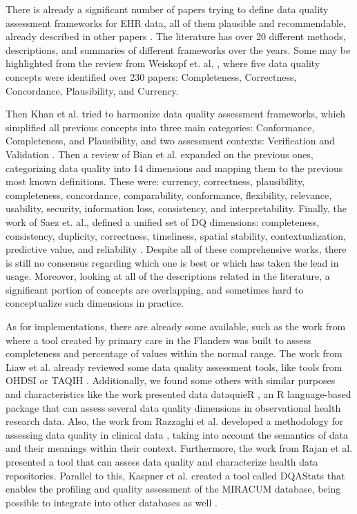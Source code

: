 There is already a significant number of papers trying to define data quality assessment frameworks for EHR data, all of them plausible and recommendable, already described in other papers \cite{bianAssessingPracticeData2020}. The literature has over 20 different methods, descriptions, and summaries of different frameworks over the years. Some may be highlighted from the review from Weiskopf et. al, \cite{weiskopfMethodsDimensionsElectronic2013}, where five data quality concepts were identified over 230 papers: Completeness, Correctness, Concordance, Plausibility, and Currency. 

Then Khan et al. tried to harmonize data quality assessment frameworks, which simplified all previous concepts into three main categories: Conformance, Completeness, and Plausibility, and two assessment contexts: Verification and Validation \cite{kahnHarmonizedDataQuality2016a}.
Then a review of Bian et al.  \cite{bianAssessingPracticeData2020} expanded on the previous ones, categorizing data quality into 14 dimensions and mapping them to the previous most known definitions. These were: currency, correctness, plausibility, completeness, concordance, comparability, conformance, flexibility, relevance, usability, security, information loss, consistency, and interpretability. 
Finally, the work of Saez et. al., defined a unified set of DQ dimensions: completeness, consistency, duplicity, correctness, timeliness, spatial stability, contextualization, predictive value, and reliability \cite{saezOrganizingDataQuality}.
Despite all of these comprehensive works, there is still no consensus regarding which one is best or which has taken the lead in usage. Moreover, looking at all of the descriptions related in the literature, a significant portion of concepts are overlapping, and sometimes hard to conceptualize such dimensions in practice. 

As for implementations, there are already some available, such as the work from \cite{phanAutomatedDataCleaning2020} where a tool created by primary care in the Flanders was built to assess completeness and percentage of values within the normal range.
The work from Liaw et al. \cite{liawQualityAssessmentRealworld2021} already reviewed some data quality assessment tools, like tools from OHDSI \cite{hripcsakObservationalHealthData2015} or TAQIH \cite{alvarezsanchezTAQIHToolTabular2019}. 
Additionally, we found some others with similar purposes and characteristics like the work presented data dataquieR \cite{schmidtFacilitatingHarmonizedData2021}, an R language-based package that can assess several data quality dimensions in observational health research data. 
Also, the work from Razzaghi et al. developed a methodology for assessing data quality in clinical data \cite{razzaghiDevelopingSystematicApproach2022}, taking into account the semantics of data and their meanings within their context. Furthermore, the work from Rajan et al. \cite{rajanContentAgnosticComputable2019} presented a tool that can assess data quality and characterize health data repositories. Parallel to this, Kaspner et al. created a tool called DQAStats that enables the profiling and quality assessment of the MIRACUM database, being possible to integrate into other databases as well \cite{kapsnerLinkingConsortiumWideData2021a}.

